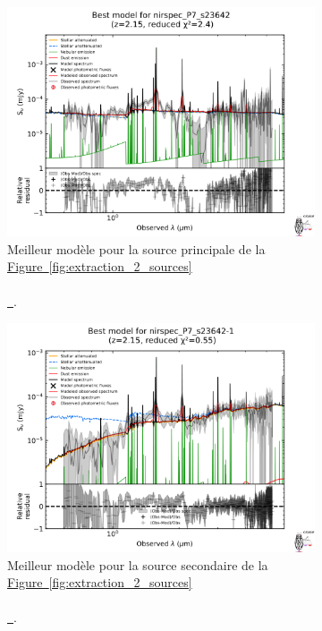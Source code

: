 \documentclass[12pt, a4paper]{article}
\newcommand*{\figref}[2][]{%
  \hyperref[{#2}]{%
    Figure~\ref*{#2}%
    \ifx\\#1\\%
    \else
      \,#1%
    \fi
  }%
}
\begin{document}
\begin{figure}[!h]
  \centering
     \begin{subfigure}[t]{0.45\textwidth}
         \centering
         \includegraphics[width=1.3\textwidth]{assets/nirspec_P7_s23642_best_model.png}
         \caption{Meilleur modèle pour la source principale de la \figref{fig:extraction_2_sources}.}
     \end{subfigure}
     \hfill
     \begin{subfigure}[t]{0.45\textwidth}
         \centering
         \includegraphics[width=1.3\textwidth]{assets/nirspec_P7_s23642-1_best_model.png}
         \caption{Meilleur modèle pour la source secondaire de la \figref{fig:extraction_2_sources}.}
     \end{subfigure}
     \caption{}
     \label{fig:P7_s23642_best_models}
\end{figure}
\end{document}
